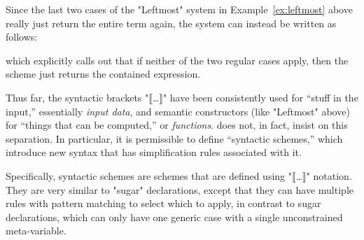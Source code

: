 \documentclass[12pt]{article} %
\begin{document}
\begin{notation}
\begin{enumerate}

\end{enumerate}
\end{notation}

\begin{example}
  Since the last two cases of the "Leftmost" system in Example~\ref{ex:leftmost} above really just
  return the entire term again, the system can instead be written as follows:
  which explicitly calls out that if neither of the two regular cases apply, then the scheme just
  returns the contained expression.
\end{example}

Thus far, the syntactic brackets "⟦…⟧" have been consistently used for ``stuff in the input,''
essentially \emph{input data}, and semantic constructors (like "Leftmost" above) for ``things that
can be computed,'' or \emph{functions}. \HAX does not, in fact, insist on this separation. In
particular, it is permissible to define ``syntactic schemes,'' which introduce new syntax that has
simplification rules associated with it.

Specifically, syntactic schemes are schemes that are defined using "⟦…⟧" notation. They are very
similar to "sugar" declarations, except that they can have multiple rules with pattern matching to
select which to apply, in contrast to sugar declarations, which can only have one generic case with
a single unconstrained meta-variable.
\end{document}
